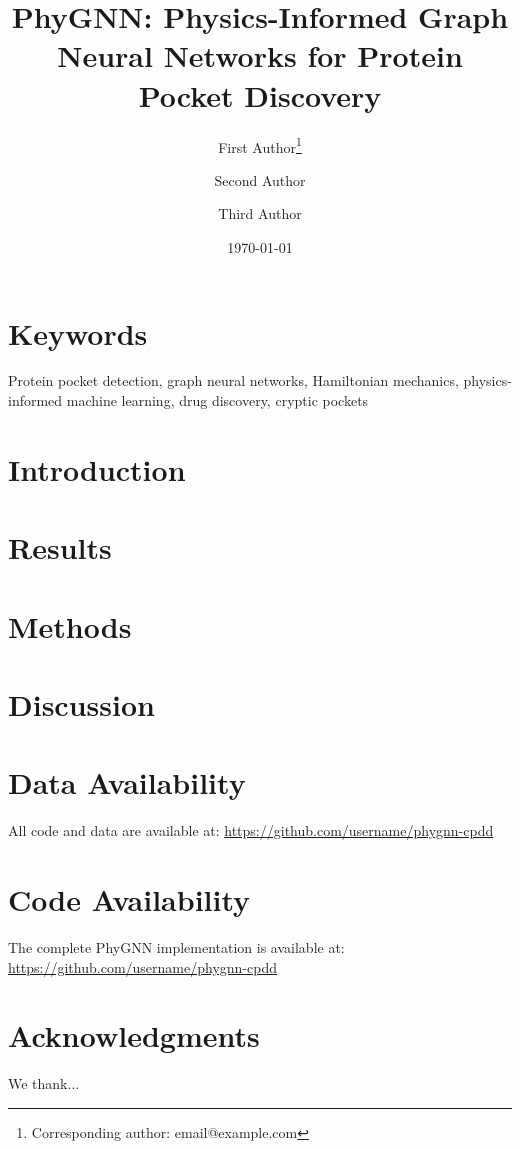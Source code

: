 \documentclass[12pt]{article}
\title{PhyGNN: Physics-Informed Graph Neural Networks for Protein Pocket Discovery}
\author{
    First Author\thanks{Corresponding author: email@example.com} \and
    Second Author \and
    Third Author
}
\date{\today}
\begin{document}
\maketitle

\begin{abstract}

\end{abstract}

\section*{Keywords}
Protein pocket detection, graph neural networks, Hamiltonian mechanics, physics-informed machine learning, drug discovery, cryptic pockets

\tableofcontents
\newpage

\section{Introduction}


\section{Results}


\section{Methods}


\section{Discussion}


\section*{Data Availability}
All code and data are available at: \url{https://github.com/username/phygnn-cpdd}

\section*{Code Availability}
The complete PhyGNN implementation is available at: \url{https://github.com/username/phygnn-cpdd}

\section*{Acknowledgments}
We thank...
\end{document}

